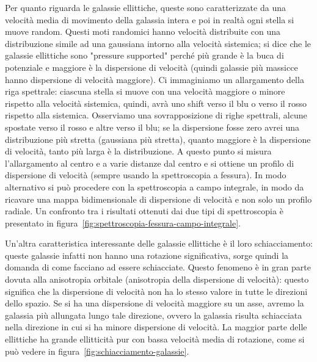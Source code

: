 Per quanto riguarda le galassie ellittiche, queste sono caratterizzate da una velocità media di movimento della galassia intera e poi in realtà ogni stella si muove random. Questi moti randomici hanno velocità distribuite con una distribuzione simile ad una gaussiana intorno alla velocità sistemica; si dice che le galassie ellittiche sono "pressure supported" perché più grande è la buca di potenziale e maggiore è la dispersione di velocità (quindi galassie più massicce hanno dispersione di velocità maggiore). Ci immaginiamo un allargamento della riga spettrale: ciascuna stella si muove con una velocità maggiore o minore rispetto alla velocità sistemica, quindi, avrà uno shift verso il blu o verso il rosso rispetto alla sistemica. Osserviamo una sovrapposizione di righe spettrali, alcune spostate verso il rosso e altre verso il blu; se la dispersione fosse zero avrei una distribuzione più stretta (gaussiana più stretta), quanto maggiore è la dispersione di velocità, tanto più larga è la distribuzione. A questo punto si misura l’allargamento al centro e a varie distanze dal centro e si ottiene un profilo di dispersione di velocità (sempre usando la spettroscopia a fessura). In modo alternativo si può procedere con la spettroscopia a campo integrale, in modo da ricavare una mappa bidimensionale di dispersione di velocità e non solo un profilo radiale. Un confronto tra i risultati ottenuti dai due tipi di spettroscopia è presentato in figura~\ref{fig:spettroscopia-fessura-campo-integrale}.

Un'altra caratteristica interessante delle galassie ellittiche è il loro schiacciamento: queste galassie infatti non hanno una rotazione significativa, sorge quindi la domanda di come facciano ad essere schiacciate. Questo fenomeno è in gran parte dovuta alla anisotropia orbitale (anisotropia della dispersione di velocità): questo significa che la dispersione di velocità non ha lo stesso valore in tutte le direzioni dello spazio. Se si ha una dispersione di velocità maggiore su un asse, avremo la galassia più allungata lungo tale direzione, ovvero la galassia risulta schiacciata nella direzione in cui si ha minore dispersione di velocità. La maggior parte delle ellittiche ha grande ellitticità pur con bassa velocità media di rotazione, come si può vedere in figura~\ref{fig:schiacciamento-galassie}.

